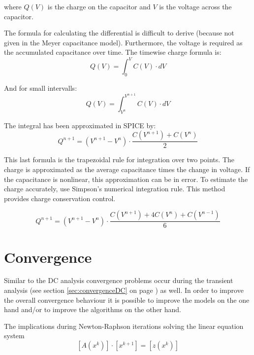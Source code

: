 where $Q(V)$ is the charge on the capacitor and $V$ is the voltage
across the capacitor.

\addvspace{12pt}

The formula for calculating the differential is difficult to derive
(because not given in the Meyer capacitance model).  Furthermore, the
voltage is required as the accumulated capacitance over time.  The
timewise charge formula is:
\begin{equation}
Q(V) = \int^{V}_{0} C(V)\cdot dV
\end{equation}

And for small intervalls:
\begin{equation}
Q(V) = \int^{V^{n+1}}_{V^{n}} C(V)\cdot dV
\end{equation}

The integral has been approximated in SPICE by:
\begin{equation}
Q^{n+1} = \left(V^{n+1} - V^{n}\right)\cdot \dfrac{C(V^{n+1}) + C(V^{n})}{2}
\end{equation}

This last formula is the trapezoidal rule for integration over two
points.  The charge is approximated as the average capacitance times
the change in voltage.  If the capacitance is nonlinear, this
approximation can be in error.  To estimate the charge accurately, use
Simpson's numerical integration rule.  This method provides charge
conservation control.

\begin{equation}
Q^{n+1} = \left(V^{n+1} - V^{n}\right)\cdot \dfrac{C(V^{n+1}) + 4 C(V^{n}) + C(V^{n-1})}{6}
\end{equation}

\section{Convergence}

Similar to the DC analysis convergence problems occur during the
transient analysis (see section \ref{sec:convergenceDC} on page
\pageref{sec:convergenceDC}) as well.  In order to improve the overall
convergence behaviour it is possible to improve the models on the one
hand and/or to improve the algorithms on the other hand.

\addvspace{12pt}

The implications during Newton-Raphson iterations solving the linear
equation system
\begin{equation}
\left[A\left(x^k\right)\right] \cdot \left[x^{k+1}\right] = \left[z\left(x^k\right)\right]
\end{equation}

